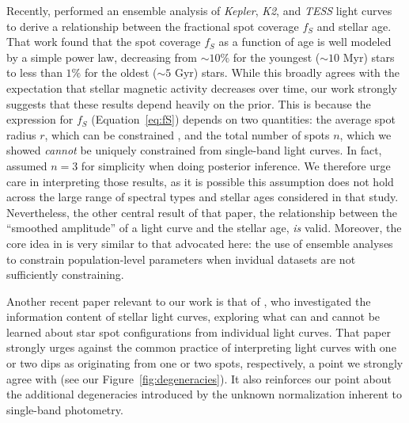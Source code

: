 \documentclass[modern,linenumbers]{aastex62}
\begin{document}
Recently, \citet{Morris2020} performed an ensemble analysis of
\emph{Kepler}, \emph{K2}, and \emph{TESS}
light curves to derive a relationship between the fractional spot
coverage $f_S$ and stellar age.
%
That work found that the spot coverage $f_S$ as a
function of age is well modeled by a simple power law, decreasing from
${\sim}10\%$ for the youngest (${\sim}10$ Myr) stars
to less than $1\%$ for the oldest (${\sim}5$ Gyr) stars.
%
While this broadly agrees with the expectation that stellar
magnetic activity decreases over time, our work strongly suggests
that these results depend heavily on the prior.
%
This is because the expression for $f_S$ (Equation~\ref{eq:fS}) depends on
two quantities: the average spot radius $r$, which can be
constrained \citep[see][]{PaperII}, and the total number of spots $n$, which
we showed \emph{cannot} be uniquely constrained from single-band light curves.
%
In fact, \citet{Morris2020} assumed $n=3$ for simplicity when doing
posterior inference. We therefore urge care in interpreting those results,
as it is possible this assumption does not hold across the large
range of spectral types and stellar ages considered in that study.
%
Nevertheless, the other central result of that paper, the relationship
between the ``smoothed amplitude'' of a light curve and the stellar age,
\emph{is} valid.
%
Moreover, the core idea in \citet{Morris2020}
\citep[and in related studies such as][]{Jackson2013}
is very similar
to that advocated here: the use of ensemble analyses to constrain population-level
parameters when invidual datasets are not sufficiently constraining.

Another recent paper relevant to our work is that of \citet{Basri2020}, who
investigated the information content of stellar light curves, exploring what
can and cannot be learned about star spot configurations from individual
light curves. That paper strongly urges against the common practice
of interpreting
light curves with one or two dips as originating from one or two spots,
respectively, a point we strongly agree with (see our Figure~\ref{fig:degeneracies}).
It also reinforces our point about the additional degeneracies introduced
by the unknown normalization inherent to single-band photometry.
%
\end{document}
